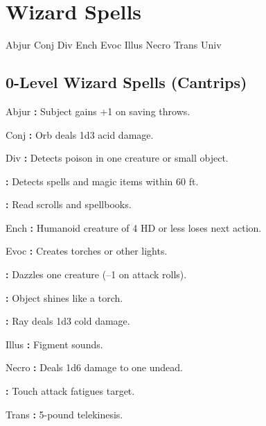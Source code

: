 \section{Wizard Spells}

\begin{multicols}{2}

Abjur
Conj
Div
Ench
Evoc
Illus
Necro
Trans
Univ


\subsection{0-Level Wizard Spells (Cantrips)}
\begin{description*}
\item Abjur \tabto{5mm} \textbf{:} Subject gains +1 on saving throws.
\item Conj \tabto{5mm} \textbf{:} Orb deals 1d3 acid damage.
\item Div \tabto{5mm} \textbf{:} Detects poison in one creature or small object.
\item \tabto{5mm} \textbf{:} Detects spells and magic items within 60 ft.
\item \tabto{5mm} \textbf{:} Read scrolls and spellbooks.
\item Ench \tabto{5mm} \textbf{:} Humanoid creature of 4 HD or less loses next action.
\item Evoc\tabto{5mm} \textbf{:} Creates torches or other lights.
\item \tabto{5mm} \textbf{:} Dazzles one creature (–1 on attack rolls).
\item\tabto{5mm} \textbf{:} Object shines like a torch.
\item \tabto{5mm} \textbf{:} Ray deals 1d3 cold damage.
\item Illus\tabto{5mm} \textbf{:} Figment sounds.
\item Necro \tabto{5mm} \textbf{:} Deals 1d6 damage to one undead.
\item \tabto{5mm} \textbf{:} Touch attack fatigues target.
\item Trans \tabto{5mm} \textbf{:} 5-pound telekinesis.

\end{description*}
\end{multicols}
